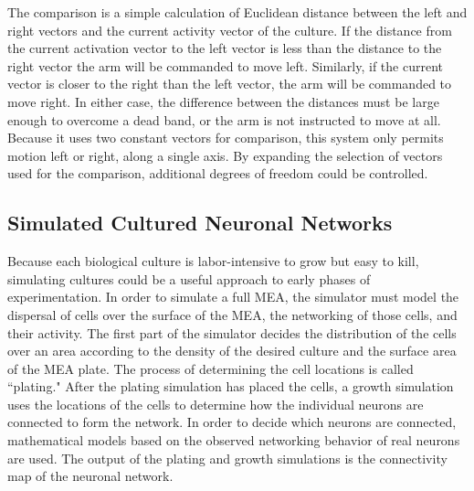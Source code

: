 \documentclass[letterpaper]{article}
\begin{document}

The comparison is a simple calculation of Euclidean distance between the left and right vectors and the current activity vector of the culture. 
If the distance from the current activation vector to the left vector is less than the distance to the right vector the arm will be commanded to move left. 
Similarly, if the current vector is closer to the right than the left vector, the arm will be commanded to move right. 
In either case, the difference between the distances must be large enough to overcome a dead band, or the arm is not instructed to move at all. 
Because it uses two constant vectors for comparison, this system only permits motion left or right, along a single axis. 
By expanding the selection of vectors used for the comparison, additional degrees of freedom could be controlled. 

\subsection{Simulated Cultured Neuronal Networks}

Because each biological culture is labor-intensive to grow but easy to kill, simulating cultures could be a useful approach to early phases of experimentation. 
In order to simulate a full MEA, the simulator must model the dispersal of cells over the surface of the MEA, the networking of those cells, and their activity. 
The first part of the simulator decides the distribution of the cells over an area according to the density of the desired culture and the surface area of the MEA plate. 
The process of determining the cell locations is called ``plating."
After the plating simulation has placed the cells, a growth simulation uses the locations of the cells to determine how the individual neurons are connected to form the network. 
In order to decide which neurons are connected, mathematical models based on the observed networking behavior of real neurons are used. 
The output of the plating and growth simulations is the connectivity map of the neuronal network. 
\end{document}
